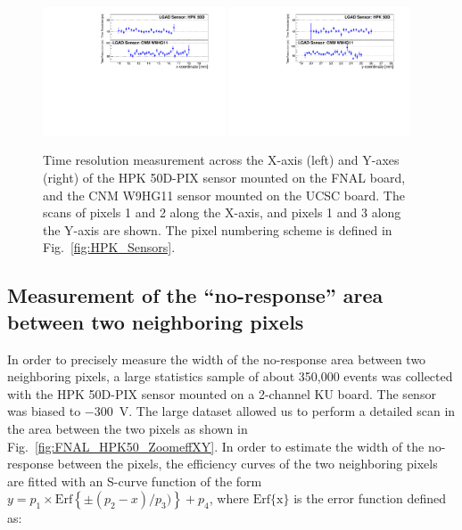 \documentclass[preprint,1p]{elsarticle}
\begin{document}
\begin{figure}[htbp] 
\centering
\includegraphics[width=0.48\textwidth]{figs/HPK50DVsCNM_TimeResolution_vs_X.pdf} 
\includegraphics[width=0.48\textwidth]{figs/HPK50DVsCNM_TimeResolution_vs_Y.pdf} 
\caption{Time resolution measurement across the X-axis (left) and Y-axes (right) of the 
HPK 50D-PIX sensor mounted on the FNAL board, and the CNM W9HG11 sensor mounted on the 
UCSC board. The scans of pixels 1 and 2 along the X-axis, and pixels 1 and 3 along the Y-axis are shown.
The pixel numbering scheme is defined in Fig.~\ref{fig:HPK_Sensors}.} 
\label{fig:FNAL_HPK50_SigmaTXY} 
\end{figure} 


\subsection{Measurement of the ``no-response'' area between two neighboring pixels}
\label{sec:HPK_50D_gap}

In order to precisely measure the width of the no-response area between two
neighboring pixels, a large statistics sample of about 350,000 events was
collected with the HPK 50D-PIX sensor mounted on a 2-channel KU board. The sensor
was biased to $-300$~V. The large dataset allowed us to perform a
detailed scan in the area between the two pixels as shown in
Fig.~\ref{fig:FNAL_HPK50_ZoomeffXY}. In order to estimate the width of the
no-response between the pixels, the efficiency curves of the two neighboring
pixels are fitted with an S-curve function of the form $y=p_1\times
\mathrm{Erf}\left\{\pm(p_2-x)/p_3)\right\}+p_4$, where $\mathrm{Erf\{x\}}$ is the error
function defined as:
\end{document}
